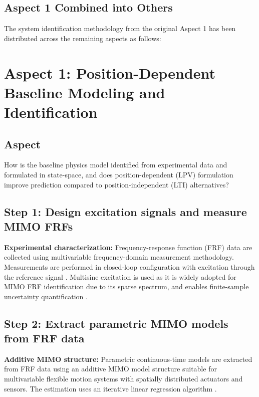 \subsection{Aspect 1 Combined into Others}

The system identification methodology from the original Aspect 1 has been distributed across the remaining aspects as follows:

\section{Aspect 1: Position-Dependent Baseline Modeling and Identification}

\subsection*{Aspect}
How is the baseline physics model identified from experimental data and formulated in state-space, and does position-dependent (LPV) formulation improve prediction compared to position-independent (LTI) alternatives?

\subsection{Step 1: Design excitation signals and measure MIMO FRFs}

\textbf{Experimental characterization:}
Frequency-response function (FRF) data are collected using multivariable frequency-domain measurement methodology. Measurements are performed in closed-loop configuration with excitation through the reference signal \citep{pintelon2012system}. Multisine excitation is used as it is widely adopted for MIMO FRF identification due to its sparse spectrum, and enables finite-sample uncertainty quantification \citep{gonzalez2025finite}.

\subsection{Step 2: Extract parametric MIMO models from FRF data}

\textbf{Additive MIMO structure:}
Parametric continuous-time models are extracted from FRF data using an additive MIMO model structure suitable for multivariable flexible motion systems with spatially distributed actuators and sensors. The estimation uses an iterative linear regression algorithm \citep{vanderhulst2025frequency}.


